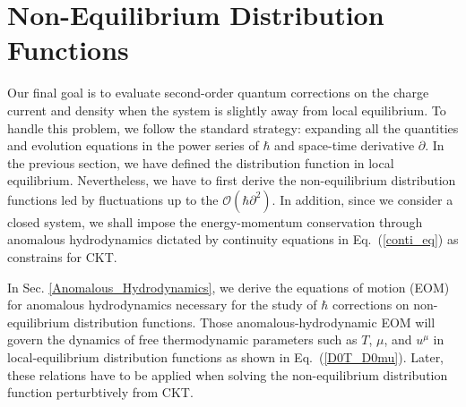 \documentclass[aps,prd,showkeys,preprint,amsmath,amssymb,nofootinbib]{revtex4-1}
\begin{document}

\section{Non-Equilibrium Distribution Functions}\label{non_eq_f}
Our final goal is to evaluate second-order quantum corrections on the charge current and density when the system is slightly away from local equilibrium. To handle this problem, we follow the standard strategy: 
expanding all the quantities and evolution equations in the power 
series of $\hbar$ and space-time derivative $\partial$. In the previous
 section, we have defined the distribution function in local equilibrium.
Nevertheless, we have to first derive the non-equilibrium distribution functions led by fluctuations up to the $\mathcal{O}(\hbar\partial^2)$.
 In addition, since we consider a closed system, we shall impose the energy-momentum conservation through anomalous hydrodynamics dictated by continuity equations in Eq.~(\ref{conti_eq}) as constrains for CKT. 
 
 In Sec. \ref{Anomalous_Hydrodynamics}, we derive the equations of motion (EOM)
 for anomalous hydrodynamics necessary for the study of $\hbar$ corrections on non-equilibrium distribution functions.
 Those anomalous-hydrodynamic EOM will govern the dynamics of free thermodynamic parameters such as $T$, $\mu$, and $u^{\mu}$ in local-equilibrium distribution functions as shown in Eq.~(\ref{D0T_D0mu}). 
 Later, these relations have to be applied when solving the non-equilibrium distribution function perturbtively from CKT.
	
\end{document}
